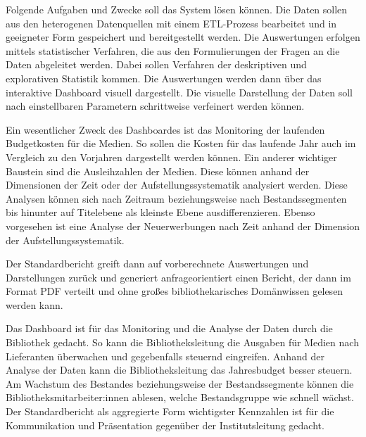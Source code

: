 
Folgende Aufgaben und Zwecke soll das System lösen können.
Die Daten sollen aus den heterogenen Datenquellen mit einem ETL-Prozess bearbeitet und in
geeigneter Form gespeichert und bereitgestellt werden. Die Auswertungen erfolgen mittels statistischer Verfahren, 
die aus den Formulierungen der Fragen an die Daten abgeleitet werden. Dabei sollen Verfahren der deskriptiven und explorativen Statistik kommen.
Die Auswertungen werden dann über das interaktive Dashboard visuell dargestellt.
Die visuelle Darstellung der Daten soll nach einstellbaren Parametern schrittweise verfeinert werden können.

Ein wesentlicher Zweck des Dashboardes ist das Monitoring der laufenden Budgetkosten für die Medien. So sollen die Kosten für das laufende Jahr auch im Vergleich zu den
Vorjahren dargestellt werden können. Ein anderer wichtiger Baustein sind die Ausleihzahlen der Medien. Diese können
anhand der Dimensionen der Zeit oder der Aufstellungssystematik analysiert werden. Diese Analysen können sich 
nach Zeitraum beziehungsweise nach Bestandssegmenten bis hinunter auf Titelebene als kleinste Ebene ausdifferenzieren. 
Ebenso vorgesehen ist eine Analyse der Neuerwerbungen nach Zeit anhand der Dimension der Aufstellungssystematik.

Der Standardbericht greift dann auf vorberechnete Auswertungen und Darstellungen zurück und generiert anfrageorientiert einen Bericht, der dann im
Format PDF verteilt und ohne großes bibliothekarisches Domänwissen gelesen werden kann.

Das Dashboard ist für das Monitoring und die Analyse der Daten durch die Bibliothek gedacht. 
So kann die Bibliotheksleitung die Ausgaben für Medien nach Lieferanten überwachen und gegebenfalls steuernd eingreifen.
Anhand der Analyse der Daten kann die Bibliotheksleitung das Jahresbudget besser steuern.
Am Wachstum des Bestandes beziehungsweise der Bestandssegmente können die Bibliotheksmitarbeiter:innen ablesen, welche Bestandsgruppe
wie schnell wächst.
Der Standardbericht als aggregierte Form wichtigster Kennzahlen ist für die Kommunikation und Präsentation gegenüber der Institutsleitung gedacht.

